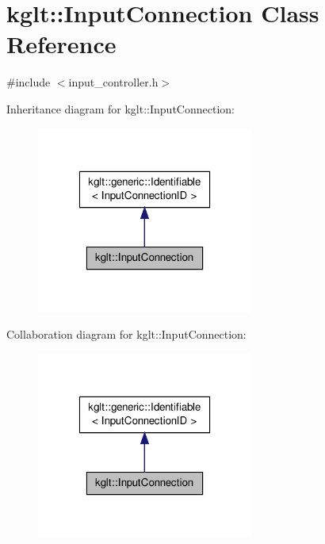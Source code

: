 \hypertarget{classkglt_1_1_input_connection}{\section{kglt\-:\-:Input\-Connection Class Reference}
\label{classkglt_1_1_input_connection}
}


{\ttfamily \#include $<$input\-\_\-controller.\-h$>$}



Inheritance diagram for kglt\-:\-:Input\-Connection\-:\nopagebreak
\begin{figure}[H]
\begin{center}
\leavevmode
\includegraphics[width=202pt]{classkglt_1_1_input_connection__inherit__graph}
\end{center}
\end{figure}


Collaboration diagram for kglt\-:\-:Input\-Connection\-:\nopagebreak
\begin{figure}[H]
\begin{center}
\leavevmode
\includegraphics[width=202pt]{classkglt_1_1_input_connection__coll__graph}
\end{center}
\end{figure}
